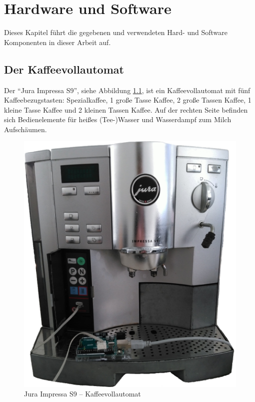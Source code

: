 \chapter{Hardware und Software}
Dieses Kapitel führt die gegebenen und verwendeten Hard- und Software Komponenten in dieser Arbeit auf.

\section{Der Kaffeevollautomat}
Der "`Jura Impressa S9"', siehe Abbildung \ref{fig:Kaffeevollautomat}, ist ein Kaffeevollautomat mit fünf Kaffeebezugstasten: Spezialkaffee, 1 große Tasse Kaffee, 2 große Tassen Kaffee, 1 kleine Tasse Kaffee und 2 kleinen Tassen Kaffee.
Auf der rechten Seite befinden sich Bedienelemente für heißes (Tee-)Wasser und Wasserdampf zum Milch Aufschäumen.

\begin{figure}
  \begin{center}
    \includegraphics[scale=0.2]{images/Jura-Impressa-S9-small}
    \caption{Jura Impressa S9 -- Kaffeevollautomat}
    \label{fig:Kaffeevollautomat}
  \end{center}
\end{figure}

